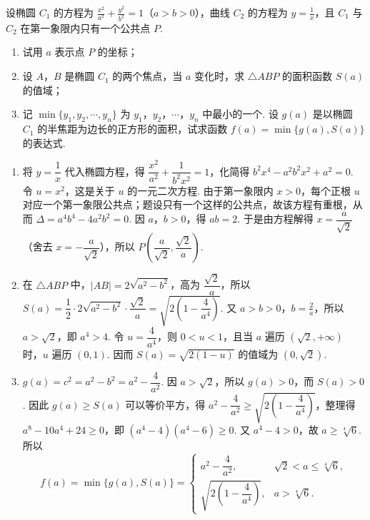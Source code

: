 \begin{problem}
设椭圆 \(C_1\) 的方程为 \(\frac{x^2}{a^2} + \frac{y^2}{b^2} = 1\)（\(a > b > 0\)），曲线 \(C_2\) 的方程为 \(y = \frac{1}{x}\)，且 \(C_1\) 与 \(C_2\) 在第一象限内只有一个公共点 \(P\).

\begin{enumerate}
\item 试用 \(a\) 表示点 \(P\) 的坐标；
\item 设 \(A\)，\(B\) 是椭圆 \(C_1\) 的两个焦点，当 \(a\) 变化时，求 \(\triangle ABP\) 的面积函数 \(S(a)\) 的值域；
\item 记 \(\min\{y_1, y_2, \cdots, y_n\}\) 为 \(y_1\)，\(y_2\)，\(\cdots\)，\(y_n\) 中最小的一个. 设 \(g(a)\) 是以椭圆 \(C_1\) 的半焦距为边长的正方形的面积，试求函数 \(f(a) = \min\{g(a), S(a)\}\) 的表达式.
\end{enumerate}
\end{problem}

\begin{solution}
\begin{enumerate}
\item 将 \(y=\dfrac{1}{x}\) 代入椭圆方程，得 \(\dfrac{x^2}{a^2}+\dfrac{1}{b^2x^2}=1\)，化简得 \(b^2x^4-a^2b^2x^2+a^2=0\). 令 \(u=x^2\)，这是关于 \(u\) 的一元二次方程. 由于第一象限内 \(x>0\)，每个正根 \(u\) 对应一个第一象限公共点；题设只有一个这样的公共点，故该方程有重根，从而 \(\Delta=a^4b^4-4a^2b^2=0\). 因 \(a\)，\(b>0\)，得 \(ab=2\). 于是由方程解得 \(x=\dfrac{a}{\sqrt2}\)（舍去 \(x=-\dfrac{a}{\sqrt2}\)），所以 \(P\left(\dfrac{a}{\sqrt2},\dfrac{\sqrt2}{a}\right)\).

\item 在 \(\triangle ABP\) 中，\(|AB|=2\sqrt{a^2-b^2}\)，高为 \(\dfrac{\sqrt2}{a}\)，所以 \(S(a)=\dfrac12\cdot2\sqrt{a^2-b^2}\cdot\dfrac{\sqrt2}{a}=\sqrt{2\left(1-\dfrac{4}{a^4}\right)}\).
又 \(a>b>0\)，\(b=\frac{2}{a}\)，所以 \(a>\sqrt2\)，即 \(a^4>4\). 令 \(u=\dfrac4{a^4}\)，则 \(0<u<1\)，且当 \(a\) 遍历 \((\sqrt2,+\infty)\) 时，\(u\) 遍历 \((0,1)\). 因而 \(S(a)=\sqrt{2(1-u)}\) 的值域为 \((0,\sqrt2)\).

\item
\(g(a)=c^2=a^2-b^2=a^2-\dfrac{4}{a^2}\). 因 \(a>\sqrt2\)，所以 \(g(a)>0\)，而 \(S(a)>0\). 因此 \(g(a)\ge S(a)\) 可以等价平方，得 \(a^2-\dfrac{4}{a^2}\ge\sqrt{2\left(1-\dfrac{4}{a^4}\right)}\)，整理得 \(a^8-10a^4+24\ge0\)，即 \((a^4-4)(a^4-6)\ge0\). 又 \(a^4-4>0\)，故 \(a\ge\sqrt[4]{6}\).
所以
\[
f(a)=\min\{g(a),S(a)\}=
\begin{cases}
a^2-\dfrac{4}{a^2}, & \sqrt2<a\le\sqrt[4]{6},\\
\sqrt{2\left(1-\dfrac{4}{a^4}\right)}, & a>\sqrt[4]{6}.
\end{cases}
\]
\end{enumerate}
\end{solution}
